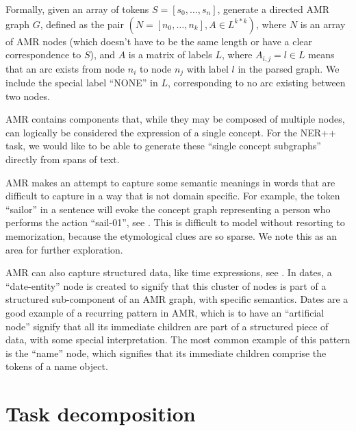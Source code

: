 \documentclass[11pt]{article}
\begin{document}
Formally, given an array of tokens $S = [s_0, \ldots, s_n]$, generate a directed AMR graph $G$, defined as the pair $(N = [n_0, \ldots, n_k], A \in L^{k*k})$, where $N$ is an array of AMR nodes (which doesn't have to be the same length or have a clear correspondence to $S$), and $A$ is a matrix of labels $L$, where $A_{i,j} = l \in L$ means that an arc exists from node $n_i$ to node $n_j$ with label $l$ in the parsed graph. We include the special label ``NONE'' in $L$, corresponding to no arc existing between two nodes.


AMR contains components that, while they may be composed of multiple nodes, can logically be considered the expression of a single concept. For the NER++ task, we would like to be able to generate these ``single concept subgraphs'' directly from spans of text.



AMR makes an attempt to capture some semantic meanings in words that are difficult to capture in a way that is not domain specific. For example, the token ``sailor'' in a sentence will evoke the concept graph representing a person who performs the action ``sail-01'', see . This is difficult to model without resorting to memorization, because the etymological clues are so sparse. We note this as an area for further exploration.

AMR can also capture structured data, like time expressions, see . In dates, a ``date-entity'' node is created to signify that this cluster of nodes is part of a structured sub-component of an AMR graph, with specific semantics. Dates are a good example of a recurring pattern in AMR, which is to have an ``artificial node'' signify that all its immediate children are part of a structured piece of data, with some special interpretation. The most common example of this pattern is the ``name'' node, which signifies that its immediate children comprise the tokens of a name object.

\section{Task decomposition}
\end{document}
